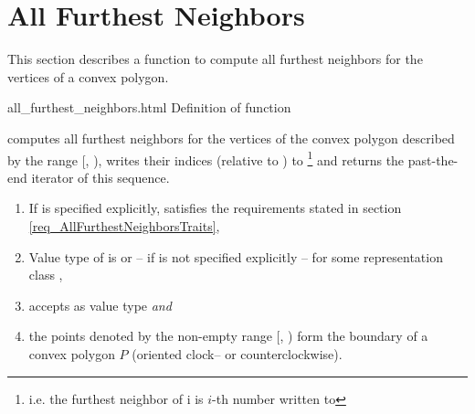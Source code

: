 
\clearpage
\section{All Furthest Neighbors}
\label{secAllFurthestNeighbors}
\cgalColumnLayout

This section describes a function to compute all furthest neighbors
for the vertices of a convex polygon. 

\ccHtmlNoClassToc
\begin{ccHtmlClassFile}{all_furthest_neighbors.html}
  {Definition of function }
  

  \def\ccLongParamLayout{\ccTrue} 

  
  computes all furthest neighbors for the vertices of the convex
  polygon described by the range [,
  ), writes their indices (relative to
  ) to \footnote{i.e. the furthest neighbor
    of \ccc{points_begin[}i\ccc{]} is \ccc{points_begin[}$i$-th number
    written to \ccc{]}} and returns the past-the-end iterator
  of this sequence.

  \begin{enumerate}
  \item If  is specified explicitly,  satisfies the
    requirements stated in section \ref{req_AllFurthestNeighborsTraits},
  \item Value type of  is  or
    -- if  is not specified explicitly -- 
    for some representation class ,
  \item {} accepts  as value type
    \textit{and}
  \item the points denoted by the non-empty range [,
    ) form the boundary of a convex polygon $P$
    (oriented clock-- or counterclockwise).
  \end{enumerate}
  

\end{ccHtmlClassFile}
